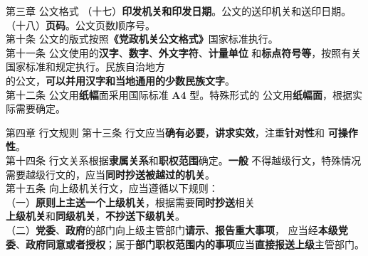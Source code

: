 \documentclass[aspectratio=169]{beamer}
\begin{document}
    \begin{frame}[t]{第三章 公文格式} \vspace{20pt}
        （十七）\textbf{印发机关和印发日期}。公文的送印机关和送印日期。\\
        （十八）\textbf{页码}。公文页数顺序号。\\
        第十条 公文的版式按照\textbf{《党政机关公文格式》}国家标准执行。\\
        第十一条 公文使用的\textbf{汉字}、\textbf{数字}、\textbf{外文字符}、\textbf{计量单位}
        和\textbf{标点符号等}，按照有关国家标准和规定执行。民族自治地方\\
        的公文，\textbf{可以并用汉字和当地通用的少数民族文字}。\\
        第十二条 公文用\textbf{纸幅}面采用国际标准 \textbf{A4} 型。特殊形式的
        公文用\textbf{纸幅面}，根据实际需要确定。\\
    \end{frame}



    \begin{frame}[t]{第四章 行文规则} \vspace{20pt}
        第十三条 行文应当\textbf{确有必要}，\textbf{讲求实效}，注重\textbf{针对性}和
        \textbf{可操作性}。\\
        第十四条 行文关系根据\textbf{隶属关系}和\textbf{职权范围}确定。\textbf{一般}
        不得越级行文，特殊情况需要越级行文的，应当\textbf{同时抄送被越过的机关}。\\

        第十五条 向上级机关行文，应当遵循以下规则：\\
        （一）\textbf{原则上主送一个上级机关}，根据需要\textbf{同时抄送}相关\\
        \textbf{上级机关}和\textbf{同级机关}，\textbf{不抄送下级机关}。\\
        （二）\textbf{党委}、\textbf{政府}的部门向上级主管部门\textbf{请示}、\textbf{报告重大事项}，
        应当经\textbf{本级党委}、\textbf{政府同意或者授权}；属于\textbf{部门职权范围内的事项}应当\textbf{直接报送上级}主管部门。\\

    \end{frame}
\end{document}
